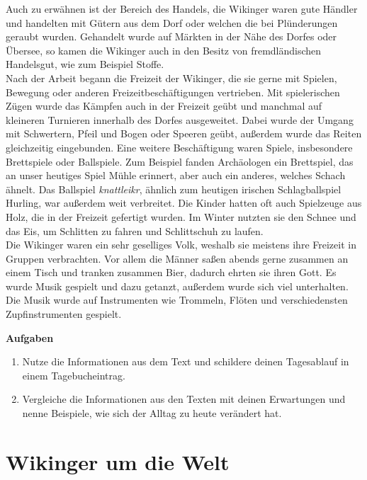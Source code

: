\documentclass[12pt,a4paper,ngerman,openany]{book}
\newcommand{\aufgaben}[1]{
  \begin{tcolorbox}
    \textbf{Aufgaben}
    \begin{enumerate}
      #1
    \end{enumerate}
  \end{tcolorbox}
} %
\newcommand{\fchapter}[1]{\chapter{#1}\thispagestyle{chapterstyle}}
\begin{document}
Auch zu erwähnen ist der Bereich des Handels, die Wikinger waren gute Händler und handelten mit Gütern aus dem Dorf oder welchen die bei Plünderungen geraubt wurden. Gehandelt wurde auf Märkten in der Nähe des Dorfes oder Übersee, so kamen die Wikinger auch in den Besitz von fremdländischen Handelsgut, wie zum Beispiel Stoffe.\\
Nach der Arbeit begann die Freizeit der Wikinger, die sie gerne mit Spielen, Bewegung oder anderen Freizeitbeschäftigungen vertrieben.
Mit spielerischen Zügen wurde das Kämpfen auch in der Freizeit geübt und manchmal auf kleineren Turnieren innerhalb des Dorfes ausgeweitet. Dabei wurde der Umgang mit Schwertern, Pfeil und Bogen oder Speeren geübt, außerdem wurde das Reiten gleichzeitig eingebunden. Eine weitere Beschäftigung waren Spiele, insbesondere Brettspiele oder Ballspiele. Zum Beispiel fanden Archäologen ein Brettspiel, das an unser heutiges Spiel \glqq Mühle\grqq{} erinnert, aber auch ein anderes, welches Schach ähnelt. Das Ballspiel \textit{knattleikr}, ähnlich zum heutigen irischen Schlagballspiel \glqq Hurling\grqq{}, war außerdem weit verbreitet. Die Kinder hatten oft auch Spielzeuge aus Holz, die in der Freizeit gefertigt wurden. Im Winter nutzten sie den Schnee und das Eis, um Schlitten zu fahren und Schlittschuh zu laufen.\\
Die Wikinger waren ein sehr geselliges Volk, weshalb sie meistens ihre Freizeit in Gruppen verbrachten.
Vor allem die Männer saßen abends gerne zusammen an einem Tisch und tranken zusammen Bier, dadurch ehrten sie ihren Gott. Es wurde Musik gespielt und dazu getanzt, außerdem wurde sich viel unterhalten. Die Musik wurde auf Instrumenten wie Trommeln, Flöten und verschiedensten Zupfinstrumenten gespielt.


\aufgaben{
  \item Nutze die Informationen aus dem Text und schildere deinen Tagesablauf in einem Tagebucheintrag.
  \item Vergleiche die Informationen aus den Texten mit deinen Erwartungen und nenne Beispiele, wie sich der Alltag zu heute verändert hat.
}

\fchapter{Wikinger um die Welt}
\end{document}
